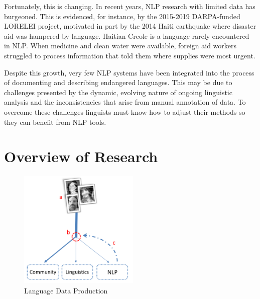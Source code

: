 Fortunately, this is changing. In recent years, NLP research with limited data has burgeoned. This is evidenced, for instance, by the 2015-2019 DARPA-funded LORELEI project, motivated in part by the 2014 Haiti earthquake where disaster aid was hampered by language. Haitian Creole is a language rarely encountered in NLP. When medicine and clean water were available, foreign aid workers struggled to process information that told them where supplies were most urgent. 

Despite this growth, very few NLP systems have been integrated into the process of documenting and describing endangered languages. This may be due to challenges presented by the dynamic, evolving nature of ongoing linguistic analysis and the inconsistencies that arise from manual annotation of data. To overcome these challenges linguists must know how to adjust their methods
so they can benefit from NLP tools.


\section{Overview of Research}

\begin{figure}[b]
\centering
\includegraphics[width=5.75cm]{figs/Flowchart.PNG}
\caption[Language Data Production]{Language Data Production}
\label{fig:flowchart}
\end{figure}

